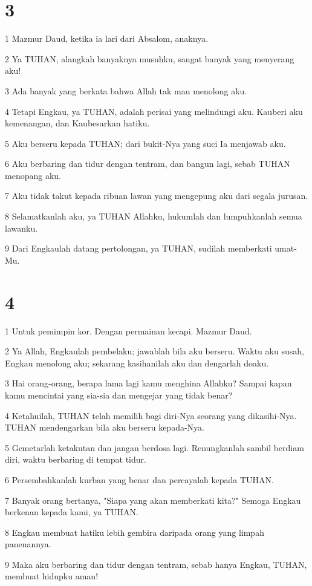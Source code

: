 \chapter{3}

\par 1 Mazmur Daud, ketika ia lari dari Absalom, anaknya.
\par 2 Ya TUHAN, alangkah banyaknya musuhku, sangat banyak yang menyerang aku!
\par 3 Ada banyak yang berkata bahwa Allah tak mau menolong aku.
\par 4 Tetapi Engkau, ya TUHAN, adalah perisai yang melindungi aku. Kauberi aku kemenangan, dan Kaubesarkan hatiku.
\par 5 Aku berseru kepada TUHAN; dari bukit-Nya yang suci Ia menjawab aku.
\par 6 Aku berbaring dan tidur dengan tentram, dan bangun lagi, sebab TUHAN menopang aku.
\par 7 Aku tidak takut kepada ribuan lawan yang mengepung aku dari segala jurusan.
\par 8 Selamatkanlah aku, ya TUHAN Allahku, hukumlah dan lumpuhkanlah semua lawanku.
\par 9 Dari Engkaulah datang pertolongan, ya TUHAN, sudilah memberkati umat-Mu.

\chapter{4}

\par 1 Untuk pemimpin kor. Dengan permainan kecapi. Mazmur Daud.
\par 2 Ya Allah, Engkaulah pembelaku; jawablah bila aku berseru. Waktu aku susah, Engkau menolong aku; sekarang kasihanilah aku dan dengarlah doaku.
\par 3 Hai orang-orang, berapa lama lagi kamu menghina Allahku? Sampai kapan kamu mencintai yang sia-sia dan mengejar yang tidak benar?
\par 4 Ketahuilah, TUHAN telah memilih bagi diri-Nya seorang yang dikasihi-Nya. TUHAN mendengarkan bila aku berseru kepada-Nya.
\par 5 Gemetarlah ketakutan dan jangan berdosa lagi. Renungkanlah sambil berdiam diri, waktu berbaring di tempat tidur.
\par 6 Persembahkanlah kurban yang benar dan percayalah kepada TUHAN.
\par 7 Banyak orang bertanya, "Siapa yang akan memberkati kita?" Semoga Engkau berkenan kepada kami, ya TUHAN.
\par 8 Engkau membuat hatiku lebih gembira daripada orang yang limpah panenannya.
\par 9 Maka aku berbaring dan tidur dengan tentram, sebab hanya Engkau, TUHAN, membuat hidupku aman!

